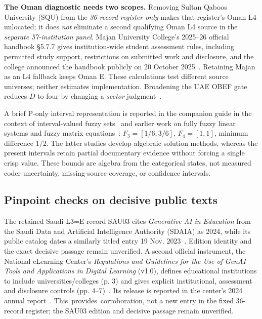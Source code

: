 \documentclass[conference,letterpaper]{IEEEtran}
\begin{document}
\textbf{The Oman diagnostic needs two scopes.} Removing Sultan Qaboos University (SQU) from the \emph{36-record register only} makes that register's Oman L4 unlocated; it does \emph{not} eliminate a second qualifying Oman L4 source in the \emph{separate 57-institution panel}. Majan University College's 2025--26 official handbook \S5.7.7 gives institution-wide student assessment rules, including permitted study support, restrictions on submitted work and disclosure, and the college announced the handbook publicly on 20 October 2025~\cite{majanhb,majannews}. Retaining Majan as an L4 fallback keeps Oman E. These calculations test different source universes; neither estimates implementation. Broadening the UAE OBEF gate reduces $D$ to four by changing a \emph{sector} judgment~\cite{obef}.

A brief P-only interval representation is reported in the companion guide in the context of interval-valued fuzzy sets~\cite{petry,pekala} and earlier work on fully fuzzy linear systems and fuzzy matrix equations~\cite{malkawi2014,wandaud2016,wandaud2018,malkawiASET2018,elsayed2022}: $F_3=[1/6,3/6]$, $F_4=[1,1]$, minimum difference $1/2$. The latter studies develop algebraic solution methods, whereas the present intervals retain partial documentary evidence without forcing a single crisp value. These bounds are algebra from the categorical states, not measured coder uncertainty, missing-source coverage, or confidence intervals.

\subsection{Pinpoint checks on decisive public texts}
The retained Saudi L3=E record SAU03 cites \emph{Generative AI in Education} from the Saudi Data and Artificial Intelligence Authority (SDAIA) as 2024, while its public catalog dates a similarly titled entry 19 Nov. 2023~\cite{sdaiacat}. Edition identity and the exact decisive passage remain unverified. A second official instrument, the National eLearning Center's \emph{Regulations and Guidelines for the Use of GenAI Tools and Applications in Digital Learning} (v1.0), defines educational institutions to include universities/colleges (p. 3) and gives explicit institutional, assessment and disclosure controls (pp. 4--7)~\cite{nelcguide}. Its release is reported in the center's 2024 annual report~\cite{nelcreport}. This~provides~corroboration, not a new entry in the fixed 36-record register; the SAU03 edition and decisive passage remain unverified.
\end{document}
